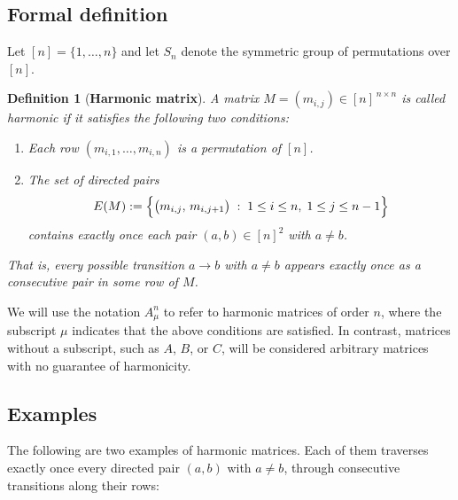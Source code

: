 \documentclass{article}
\newtheorem{definition}[theorem]{Definition}
\begin{document}
\subsection{Formal definition}

Let \([n] = \{1, \dots, n\}\) and let \(S_n\) denote the symmetric group of permutations over \([n]\).

\begin{definition}[\textbf{Harmonic matrix}]
A matrix \(M = (m_{i,j}) \in [n]^{\,n \times n}\) is called \emph{harmonic} if it satisfies the following two conditions:

\begin{enumerate}
    \item[(i)] Each row \((m_{i,1}, \dots, m_{i,n})\) is a permutation of \([n]\).
    \item[(ii)] The set of directed pairs
        \[
          E(M) := \Bigl\{ \bigl(m_{i,j},\, m_{i,j+1} \bigr) \;:\; 1 \le i \le n,\; 1 \le j \le n - 1 \Bigr\}
        \]
        contains \emph{exactly once} each pair \((a, b) \in [n]^2\) with \(a \ne b\).
\end{enumerate}
That is, every possible transition \(a \to b\) with \(a \ne b\) appears exactly once as a consecutive pair in some row of \(M\).
\end{definition}

We will use the notation \(A_\mu^n\) to refer to harmonic matrices of order \(n\), where the subscript \(\mu\) indicates that the above conditions are satisfied. In contrast, matrices without a subscript, such as \(A\), \(B\), or \(C\), will be considered arbitrary matrices with no guarantee of harmonicity.


\subsection{Examples}

The following are two examples of harmonic matrices. Each of them traverses exactly once every directed pair \((a, b)\) with \(a \ne b\), through consecutive transitions along their rows:
\end{document}

